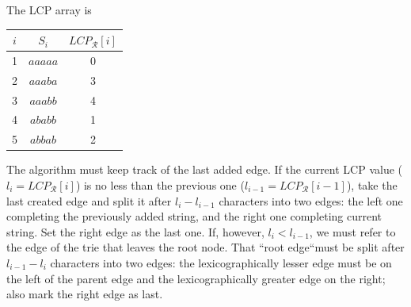 \documentclass[10pt]{article}
\begin{document}
The LCP array is
\begin{center}
\begin{tabular}{|c|c|c|}
\hline
$i$ & $S_i$ & $LCP_{\mathcal{R}}[i]$ \\
\hline 
1 & $aaaaa$ & 0 \\
2 & $aaaba$ & 3 \\
3 & $aaabb$ & 4 \\
4 & $ababb$ & 1 \\
5 & $abbab$ & 2 \\
\hline
\end{tabular}
\end{center}
The algorithm must keep track of the last added edge. If the current LCP value ($l_i = LCP_{\mathcal{R}}[i]$)  is no less than the previous one ($l_{i - 1} = LCP_{\mathcal{R}}[i - 1]$), take the last created edge and split it after $l_i - l_{i - 1}$ characters into two edges: the left one completing the previously added string, and the right one completing current string. Set the right edge as the last one. If, however, $l_i < l_{i - 1}$, we must refer to the edge of the trie that leaves the root node. That ``root edge``must be split after $l_{i - 1} - l_i$ characters into two edges: the lexicographically lesser edge must be on the left of the parent edge and the lexicographically greater edge on the right; also mark the right edge as last.
\end{document}

